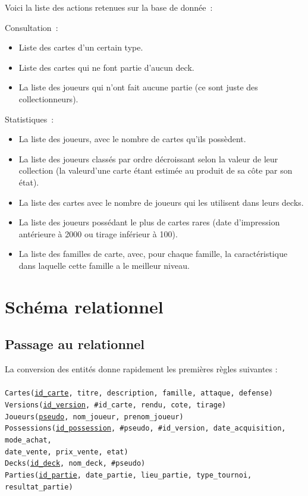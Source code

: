 \documentclass[a4paper,10.5pt]{article}
\begin{document}
Voici la liste des actions retenues sur la base de donnée~:

Consultation~:

\begin{itemize}
  \item Liste des cartes d’un certain type.
  \item Liste des cartes qui ne font partie d’aucun deck.
  \item La liste des joueurs qui n’ont fait aucune partie (ce sont juste des collectionneurs).
\end{itemize}

Statistiques~:

\begin{itemize}
  \item La liste des joueurs, avec le nombre de cartes qu’ils possèdent.
  \item La liste des joueurs classés par ordre décroissant selon la valeur de
    leur collection (la valeurd’une carte étant estimée au produit de sa côte
    par son état).
  \item La liste des cartes avec le nombre de joueurs qui les utilisent dans
    leurs decks.
  \item La liste des joueurs possédant le plus de cartes rares (date
    d’impression antérieure à 2000 ou tirage inférieur à 100).
  \item La liste des familles de carte, avec, pour chaque famille, la
    caractéristique dans laquelle cette famille a le meilleur niveau.
\end{itemize}

\section{Schéma relationnel}
\subsection{Passage au relationnel}

La conversion des entités donne rapidement les premières règles suivantes :\\
\\
\texttt{Cartes(\underline{id\_carte}, titre, description, famille, attaque, defense)} \\
\texttt{Versions(\underline{id\_version}, \#id\_carte, rendu, cote, tirage)} \\
\texttt{Joueurs(\underline{pseudo}, nom\_joueur, prenom\_joueur)} \\
\texttt{Possessions(\underline{id\_possession}, \#pseudo, \#id\_version, date\_acquisition, mode\_achat,\\ date\_vente, prix\_vente, etat)} \\
\texttt{Decks(\underline{id\_deck}, nom\_deck, \#pseudo)} \\
\texttt{Parties(\underline{id\_partie}, date\_partie, lieu\_partie, type\_tournoi, resultat\_partie)} \\
\end{document}
